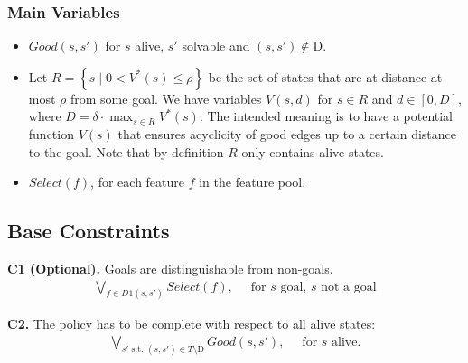 \documentclass[a4paper]{article}
\newcommand{\smallpar}[1]{{\vspace{10pt}\noindent \bf #1.}}
\newcommand{\setst}[2]{\ensuremath{\left\{#1 \mid #2 \right\}}}
\newcommand{\badtx}{\ensuremath{\mathrm{D}}}
\begin{document}
\subsubsection{Main Variables}
\begin{itemize}
 \item $Good(s, s')$ for $s$ alive, $s'$ solvable and $(s, s') \not\in \badtx$.

 \item
 Let $R = \setst{s}{0 < V^*(s) \leq \rho}$ be the set of states that are at distance at most $\rho$ from some goal.
 We have variables $V(s, d)$ for $s \in R$ and $d \in [0, D]$, where $D = \delta \cdot \max_{s \in R} V^*(s)$.
 The intended meaning is to have a potential function $V(s)$ that ensures acyclicity of good edges up to a certain
 distance to the goal. Note that by definition $R$ only contains alive states.

 \item $Select(f)$, for each feature $f$ in the feature pool.
\end{itemize}



\subsection{Base Constraints}

\smallpar{C1 (Optional)}
Goals are distinguishable from non-goals.
\begin{align}
\bigvee_{f \in D1(s, s')} Select(f),&\;\; \text{for $s$ goal, $s$ not a goal}
\end{align}


\smallpar{C2}
The policy has to be complete with respect to all alive states:
\begin{align}
\bigvee_{s' \text{ s.t. } (s, s') \in T \setminus \badtx} Good(s, s'),&\;\; \text{for $s$ alive.}
\end{align}
\end{document}
